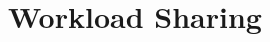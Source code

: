 \documentclass[a4paper, 11pt]{article}
\begin{document}
\section*{Workload Sharing}
\lipsum[8]




\end{document}
